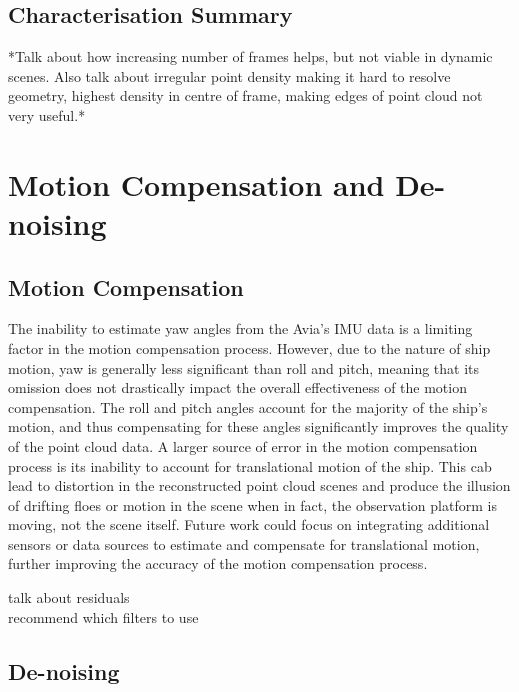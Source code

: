 \subsection{Characterisation Summary}
\label{subsec:ch8.section1.subsec3}

*Talk about how increasing number of frames helps, but not viable in dynamic scenes. Also talk about irregular point density making it hard to resolve geometry, highest density in centre of frame, making edges of point cloud not very useful.*

\section{Motion Compensation and De-noising}
\label{sec:ch8.section2}

\subsection{Motion Compensation}
\label{subsec:ch8.section2.subsec1}

The inability to estimate yaw angles from the Avia's \ac{IMU} data is a limiting factor in the motion compensation process. However, due to the nature of ship motion, yaw is generally less significant than roll and pitch, meaning that its omission does not drastically impact the overall effectiveness of the motion compensation. The roll and pitch angles account for the majority of the ship's motion, and thus compensating for these angles significantly improves the quality of the point cloud data. A larger source of error in the motion compensation process is its inability to account for translational motion of the ship. This cab lead to distortion in the reconstructed point cloud scenes and produce the illusion of drifting floes or motion in the scene when in fact, the observation platform is moving, not the scene itself. Future work could focus on integrating additional sensors or data sources to estimate and compensate for translational motion, further improving the accuracy of the motion compensation process.

talk about residuals
\\recommend which filters to use

\subsection{De-noising}
\label{subsec:ch8.section2.subsec2}

